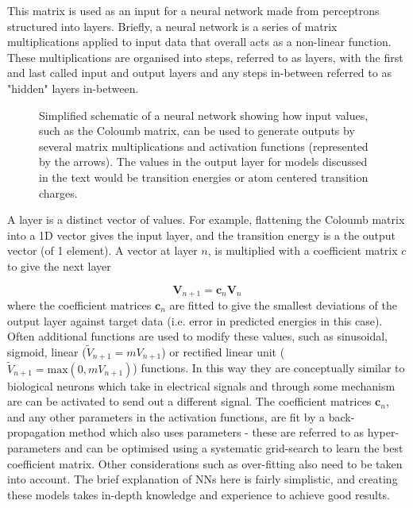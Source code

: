 This matrix is used as an input for a neural network made from perceptrons structured
into layers. Briefly, a neural network is a series of matrix multiplications applied
to input data that overall acts as a non-linear function. These multiplications 
are organised into steps, referred to as layers, with the first and last called 
input and output layers and any steps in-between referred to as "hidden" layers in-between.

\begin{figure}
	\centering
	\begin{neuralnetwork}[height=4]
        \hiddenlayer[count=4, bias=false, title=Hidden\\layer 1] \linklayers
        \hiddenlayer[count=3, bias=false, title=Hidden\\layer 2] \linklayers
        \outputlayer[count=2, title=Output\\layer] \linklayers
	\end{neuralnetwork}
	\label{fig:neural_network}
	\caption{Simplified schematic of a neural network showing how input values,
	such as the Coloumb matrix, can be used to generate outputs by several matrix
	multiplications and activation functions (represented by the arrows). The values
	in the output layer for models discussed in the text would be \Qy transition
	energies or atom centered transition charges.}
\end{figure}

A layer is a distinct vector of values. For example, flattening the Coloumb matrix
into a 1D vector gives the input layer, and the \Qy transition energy is a the output 
vector (of 1 element). A vector at layer $n$, is multiplied with a coefficient matrix 
$c$ to give the next layer

\begin{equation}
	\mathbf{V}_{n+1} = \mathbf{c}_n \mathbf{V}_n	
\end{equation}
%
where the coefficient matrices $\mathbf{c}_n$ are fitted to give the smallest deviations
of the output layer against target data (i.e. error in predicted \Qy energies in 
this case). Often additional functions are used to modify these values, such as
sinusoidal, sigmoid, linear ($\tilde{V}_{n+1}=m V_{n+1}$) or rectified linear unit 
($\tilde{V}_{n+1}=\text{max}\left(0, m V_{n+1} \right)$) functions. In this way they 
are conceptually similar to biological neurons which take in electrical signals 
and through some mechanism are can be activated to send out a different signal. 
The coefficient matrices $\mathbf{c}_n$, and any other parameters in the activation
functions, are fit by a back-propagation method which also uses parameters - these 
are referred to as hyper-parameters and can be optimised using a systematic grid-search
to learn the best coefficient matrix. Other considerations such as over-fitting 
also need to be taken into account. The brief explanation of NNs here is fairly 
simplistic, and creating these models takes in-depth knowledge and experience to
achieve good results.

